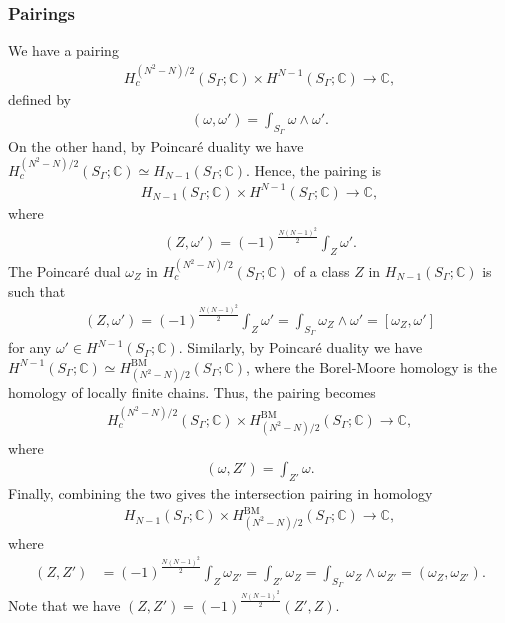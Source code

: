 \documentclass[a4paper,11pt]{amsart} %
\newcommand{\8}{\infty}
\newcommand{\BM}{\mathrm{BM}}
\newcommand{\C}{\mathbb{C}}
\theoremstyle{mytheoremstyle}
\theoremstyle{remark}
\numberwithin{equation}{section}
\begin{document}
\subsubsection{Pairings}We have a pairing
\begin{align}
  H_c^{{(N^2-N)/2}}(S_\Gamma;\C) \times H^{N-1}(S_\Gamma;\C)  \longrightarrow \C,
\end{align}
defined by
\begin{align}
 ( \omega, \omega' )=\int_{S_\Gamma} \omega \wedge \omega'.
\end{align}
On the other hand, by Poincaré duality we have $H_c^{{(N^2-N)/2}}(S_\Gamma;\C) \simeq H_{N-1}(S_\Gamma;\C)$. Hence, the pairing is
\begin{align}
H_{N-1}(S_\Gamma;\C) \times H^{N-1}(S_\Gamma;\C) \longrightarrow \C,
\end{align}
where
\begin{align}
 ( Z, \omega')=(-1)^{\frac{N(N-1)^2}{2}}\int_Z \omega'.
\end{align}
The Poincaré dual  $\omega_Z$ in $H_c^{{(N^2-N)/2}}(S_\Gamma;\C)$ of a class $Z$ in $H_{N-1}(S_\Gamma;\C)$ is such that
\begin{align}
 ( Z, \omega')=(-1)^{\frac{N(N-1)^2}{2}} \int_Z \omega'=\int_{S_\Gamma} \omega_Z \wedge \omega'=[ \omega_Z, \omega']
\end{align}
for any $\omega' \in H^{N-1}(S_\Gamma;\C)$. Similarly, by Poincaré duality we have $H^{N-1}(S_\Gamma;\C) \simeq H^{\BM}_{(N^2-N)/2}(S_\Gamma;\C)$, where the Borel-Moore homology is the homology of locally finite chains. Thus, the pairing becomes
\begin{align}
H_c^{{(N^2-N)/2}}(S_\Gamma;\C) \times H^{\BM}_{(N^2-N)/2}(S_\Gamma;\C) \longrightarrow \C,
\end{align}
where
\begin{align}
 ( \omega,Z')=\int_{Z'} \omega.
\end{align}
Finally, combining the two gives the intersection pairing in homology
\begin{align}
H_{N-1}(S_\Gamma;\C) \times H^{\BM}_{(N^2-N)/2}(S_\Gamma;\C) \longrightarrow \C,
\end{align}
where
\begin{align}
 (Z, Z') &=(-1)^{\frac{N(N-1)^2}{2}}\int_Z \omega_{Z'} =\int_{Z'} \omega_Z=\int_{S_\Gamma} \omega_Z \wedge \omega_{Z'}=(\omega_Z,\omega_{Z'}).
\end{align}
Note that we have $(Z, Z')=(-1)^{\frac{N(N-1)^2}{2}}( Z', Z)$.
\end{document}
